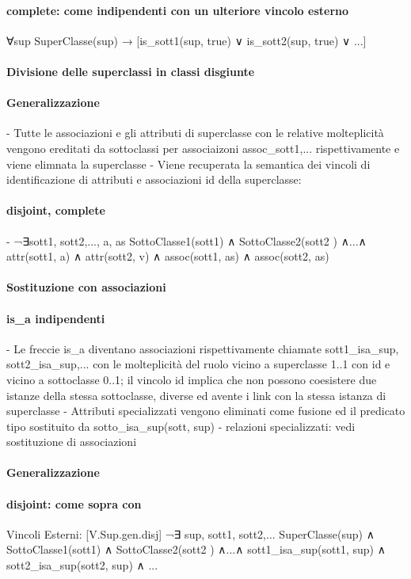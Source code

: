 \documentclass[12pt]{article}
\begin{document}
\paragraph{{complete}: come indipendenti con un ulteriore vincolo esterno}
						∀sup SuperClasse(sup) → [is_sott1(sup, true) ∨ is_sott2(sup, true)  ∨ ...]

\paragraph{Divisione delle superclassi in classi disgiunte}
\paragraph{Generalizzazione}
					- Tutte le associazioni e gli attributi di superclasse con le relative molteplicità vengono ereditati da sottoclassi per associaizoni assoc_sott1,... rispettivamente e 						viene elimnata la superclasse
					- Viene recuperata la semantica dei vincoli di identificazione di attributi e associazioni {id} della superclasse:
\paragraph{{disjoint, complete}}
						- ¬∃sott1, sott2,..., a, as  SottoClasse1(sott1) ∧ SottoClasse2(sott2 ) ∧...∧ attr(sott1, a) ∧ attr(sott2, v) ∧ assoc(sott1, as) ∧ assoc(sott2, as)
\paragraph{Sostituzione con associazioni}
\paragraph{is_a indipendenti}
					- Le freccie is_a diventano associazioni rispettivamente chiamate sott1_isa_sup, sott2_isa_sup,... con le molteplicità del ruolo vicino a superclasse 1..1 con {id} e 						vicino a sottoclasse 0..1; il vincolo {id} implica che non possono coesistere due istanze della stessa sottoclasse, diverse ed avente i link con la stessa istanza di						superclasse 
					- Attributi specializzati vengono eliminati come fusione ed il predicato tipo sostituito da sotto_isa_sup(sott, sup)
					- relazioni specializzati: vedi sostituzione di associazioni
\paragraph{Generalizzazione}
\paragraph{{disjoint}: come sopra con}
						Vincoli Esterni: [V.Sup.gen.disj]
							¬∃ sup, sott1, sott2,... SuperClasse(sup) ∧ SottoClasse1(sott1) ∧ SottoClasse2(sott2 ) ∧...∧ sott1_isa_sup(sott1, sup) ∧ sott2_isa_sup(sott2, sup) ∧ ...
\end{document}
